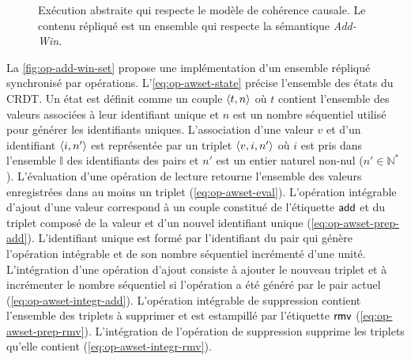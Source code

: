 \begin{figure}[tbh]
\centering
{}
\caption{Exécution abstraite qui respecte le modèle de cohérence causale.
Le contenu répliqué est un ensemble qui respecte la sémantique \emph{Add-Win}.}\label{fig:awset-example}
\end{figure}

La \autoref{fig:op-add-win-set} propose une implémentation d'un ensemble répliqué synchronisé par opérations.
L'\autoref{eq:op-awset-state} précise l'ensemble des états du \ac{CRDT}.
Un état est définit comme un couple $\tuple*{t, n}$ où $t$ contient l'ensemble des valeurs associées à leur identifiant unique et $n$ est un nombre séquentiel utilisé pour générer les identifiants uniques.
L'association d'une valeur $v$ et d'un identifiant $\tuple*{i, n'}$ est représentée par un triplet $\tuple*{v, i, n'}$ où $i$ est pris dans l'ensemble $\mathbb{I}$ des identifiants des pairs et $n'$ est un entier naturel non-nul ($n' \in \mathbb{N}^*$).
L'évaluation d'une opération de lecture retourne l'ensemble des valeurs enregistrées dans au moins un triplet (\autoref{eq:op-awset-eval}).
L'opération intégrable d'ajout d'une valeur correspond à un couple constitué de l'étiquette $\trm{add}$ et du triplet composé de la valeur et d'un nouvel identifiant unique (\autoref{eq:op-awset-prep-add}).
L'identifiant unique est formé par l'identifiant du pair qui génère l'opération intégrable et de son nombre séquentiel incrémenté d'une unité.
L'intégration d'une opération d'ajout consiste à ajouter le nouveau triplet et à incrémenter le nombre séquentiel si l'opération a été généré par le pair actuel (\autoref{eq:op-awset-integr-add}).
L'opération intégrable de suppression contient l'ensemble des triplets à supprimer et est estampillé par l'étiquette $\trm{rmv}$ (\autoref{eq:op-awset-prep-rmv}).
L'intégration de l'opération de suppression supprime les triplets qu'elle contient (\autoref{eq:op-awset-integr-rmv}).

